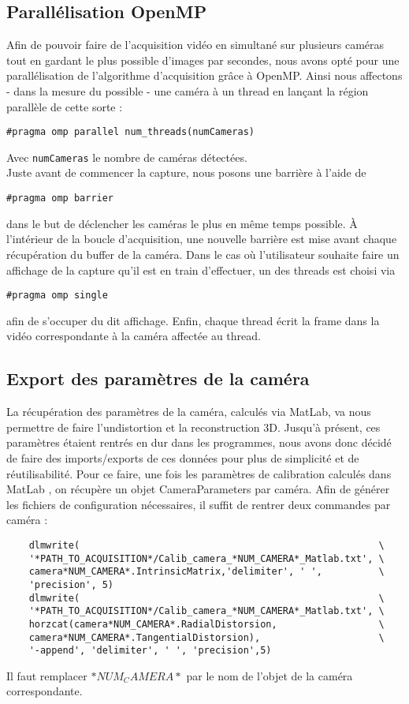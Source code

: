 \subsection{Parallélisation OpenMP}
Afin de pouvoir faire de l'acquisition vidéo en simultané sur plusieurs caméras tout en gardant le plus possible d'images par secondes, nous avons opté pour une parallélisation de l'algorithme d'acquisition grâce à OpenMP. Ainsi nous affectons - dans la mesure du possible - une caméra à un thread en lançant la région parallèle de cette sorte :
\begin{verbatim}
#pragma omp parallel num_threads(numCameras)
\end{verbatim}
Avec \texttt{numCameras} le nombre de caméras détectées. \\
Juste avant de commencer la capture, nous posons une barrière à l'aide de 
\begin{verbatim}
#pragma omp barrier
\end{verbatim}
dans le but de déclencher les caméras le plus en même temps possible.
À l'intérieur de la boucle d'acquisition, une nouvelle barrière est mise avant chaque récupération du buffer de la caméra.
Dans le cas où l'utilisateur souhaite faire un affichage de la capture qu'il est en train d'effectuer, un des threads est choisi via
\begin{verbatim}
#pragma omp single
\end{verbatim}
afin de s'occuper du dit affichage.
Enfin, chaque thread écrit la frame dans la vidéo correspondante à la caméra affectée au thread.

\subsection{Export des paramètres de la caméra}

La récupération des paramètres de la caméra, calculés via MatLab, va nous permettre de faire l'undistortion et la reconstruction 3D. Jusqu'à présent, ces paramètres étaient rentrés en dur dans les programmes, nous avons donc décidé de faire des imports/exports de ces données pour plus de simplicité et de réutilisabilité.
Pour ce faire, une fois les paramètres de calibration calculés dans MatLab , on récupère un objet CameraParameters par caméra. Afin de générer les fichiers de configuration nécessaires, il suffit de rentrer deux commandes par caméra :

\begin{verbatim}
	dlmwrite( 													  \
	'*PATH_TO_ACQUISITION*/Calib_camera_*NUM_CAMERA*_Matlab.txt', \
	camera*NUM_CAMERA*.IntrinsicMatrix,'delimiter', ' ',		  \
	'precision', 5)
	dlmwrite(													  \
	'*PATH_TO_ACQUISITION*/Calib_camera_*NUM_CAMERA*_Matlab.txt', \
	horzcat(camera*NUM_CAMERA*.RadialDistorsion,				  \
	camera*NUM_CAMERA*.TangentialDistorsion),					  \
	'-append', 'delimiter', ' ', 'precision',5)
\end{verbatim}

Il faut remplacer $*NUM_CAMERA*$ par le nom de l'objet de la caméra correspondante.